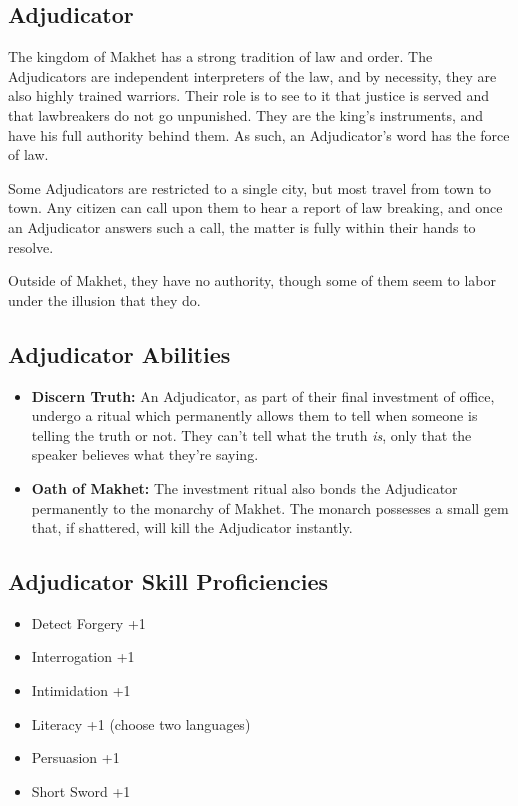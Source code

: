 \begin{multicols}{2}
\section{Adjudicator}

The kingdom of Makhet has a strong tradition of law and order. The 
Adjudicators are independent interpreters of the law, and by necessity, 
they are also highly trained warriors. Their role is to see to it that 
justice is served and that lawbreakers do not go unpunished. They are 
the king's instruments, and have his full authority behind them. As
such, an Adjudicator's word has the force of law.

Some Adjudicators are restricted to a single city, but most travel from 
town to town. Any citizen can call upon them to hear a report of law 
breaking, and once an Adjudicator answers such a call, the matter is 
fully within their hands to resolve.

Outside of Makhet, they have no authority, though some of them seem to 
labor under the illusion that they do.

\subsection{Adjudicator Abilities}

\begin{itemize}
    \item \textbf{Discern Truth:} An Adjudicator, as part of their final 
    investment of office, undergo a ritual which permanently allows them 
    to tell when someone is telling the truth or not. They can't tell 
    what the truth \textit{is}, only that the speaker believes what 
    they're saying.
    \item \textbf{Oath of Makhet:} The investment ritual also bonds the 
    Adjudicator permanently to the monarchy of Makhet. The monarch
    possesses a small gem that, if shattered, will kill the Adjudicator 
    instantly.
\end{itemize}

\subsection{Adjudicator Skill Proficiencies}

\begin{itemize}
    \item Detect Forgery +1
    \item Interrogation +1
    \item Intimidation +1
    \item Literacy +1 (choose two languages)
    \item Persuasion +1
    \item Short Sword +1
\end{itemize}


\end{multicols}
